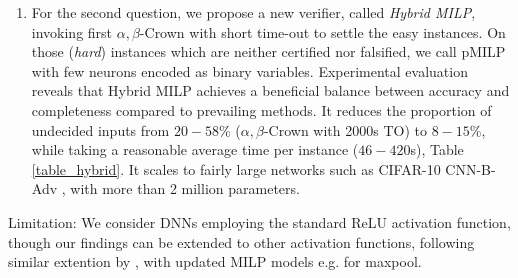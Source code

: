 \begin{enumerate}
	\item For the second question, we propose a new verifier, called {\em Hybrid MILP}, invoking first 	$\alpha,\beta$-Crown with short time-out to settle the easy instances. On those ({\em hard}) instances which are neither certified nor falsified, we call pMILP with few neurons encoded as binary variables. Experimental evaluation reveals that Hybrid MILP achieves a beneficial balance between accuracy and completeness compared to prevailing methods. It reduces the proportion of undecided inputs from $20-58\%$ ($\alpha,\beta$-Crown with 2000s TO) to $8-15\%$, while taking a reasonable average time per instance ($46-420$s), Table \ref{table_hybrid}. It scales to fairly large networks such as CIFAR-10 CNN-B-Adv \cite{SDPFI}, with more than 2 million parameters.
\end{enumerate}

Limitation: We consider DNNs employing the standard ReLU activation function, though our findings can be extended to other activation functions, following similar extention by \cite{DivideAndSlide}, with updated MILP models e.g. for maxpool. 


\newpage

